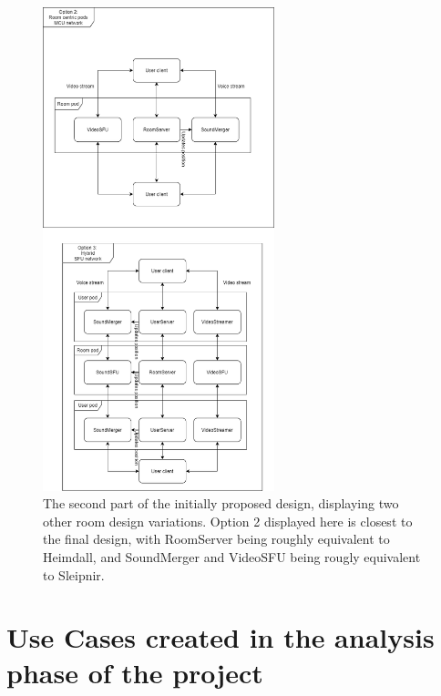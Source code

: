\begin{figure}[H]
    \centering
    \includegraphics[width=0.60\textwidth]{Pictures/InitialDesignP2.png}
    \caption{The second part of the initially proposed design, displaying two other room design variations. Option 2 displayed here is closest to the final design, with RoomServer being roughly equivalent to Heimdall, and SoundMerger and VideoSFU being rougly equivalent to Sleipnir.}
    \label{fig:initialdesign2}
\end{figure}


\newpage
\chapter{Use Cases created in the analysis phase of the project}

